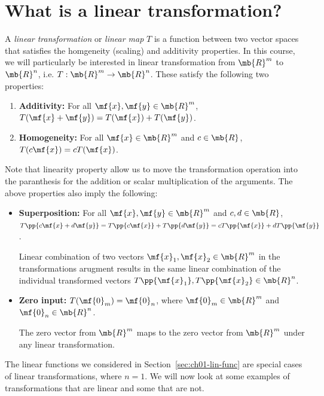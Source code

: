 \section{What is a linear transformation?}\label{sec:ch03-lin-trans-def}
A \textit{linear transformation} or \textit{linear map} $T$ is a function between two vector spaces that satisfies the homgeneity (scaling) and additivity properties. In this course, we will particularly be interested in linear transformation from $\mb{R}^m$ to $\mb{R}^n$, i.e. $T: \mb{R}^m \to \mb{R}^n$. These satisfy the following two properties:
\begin{enumerate}
    \item \textbf{Additivity:} For all $\mf{x}, \mf{y} \in \mb{R}^m$, $T(\mf{x} + \mf{y}) = T(\mf{x}) + T(\mf{y})$.
    \item \textbf{Homogeneity:} For all $\mf{x} \in \mb{R}^m$ and $c \in \mb{R}$, $T(c\mf{x}) = cT(\mf{x})$.
\end{enumerate}
Note that linearity property allow us to move the transformation operation into the paranthesis for the addition or scalar multiplication of the arguments. The above properties also imply the following:
\begin{itemize}
    \item \textbf{Superposition:} For all $\mf{x}, \mf{y} \in \mb{R}^m$ and $c, d \in \mb{R}$, $T\pp{c\mf{x} + d\mf{y}} = T\pp{c\mf{x}} + T\pp{d\mf{y}} = cT\pp{\mf{x}} + dT\pp{\mf{y}}$.
    
    Linear combination of two vectors $\mf{x}_1, \mf{x}_2 \in \mb{R}^m$  in the transformations arugment results in the same linear combination of the individual transformed vectors $T\pp{\mf{x}_1}, T\pp{\mf{x}_2} \in \mb{R}^n$. 
    
    \item \textbf{Zero input:} $T(\mf{0}_m) = \mf{0}_n$, where $\mf{0}_m \in \mb{R}^m$ and $\mf{0}_n \in \mb{R}^n$.
    
    The zero vector from $\mb{R}^m$ maps to the zero vector from $\mb{R}^m$ under any linear transformation.
\end{itemize}

The linear functions we considered in Section~\ref{sec:ch01-lin-func} are special cases of linear transformations, where $n = 1$. We will now look at some examples of transformations that are linear and some that are not.

